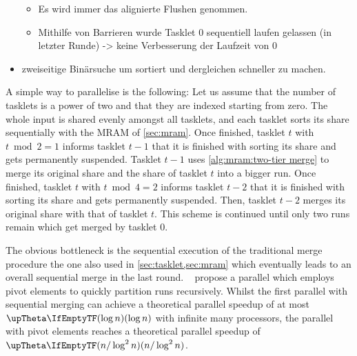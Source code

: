 \begin{itemize}
\begin{itemize}
		\item
		Es wird immer das alignierte Flushen genommen.

		\item
		Mithilfe von Barrieren wurde Tasklet 0 sequentiell laufen gelassen (in letzter Runde) -> keine Verbesserung der Laufzeit von 0
	\end{itemize}

	\item
	zweiseitige Binärsuche um sortiert und dergleichen schneller zu machen.
\end{itemize}

\medbreak

A simple way to parallelise \MS{} is the following:
Let us assume that the number of tasklets is a power of two and that they are indexed starting from zero.
The whole input is shared evenly amongst all tasklets, and each tasklet sorts its share sequentially with the MRAM \MS{} of \cref{sec:mram}.
Once finished, tasklet \(t\) with \(t \bmod 2 = 1\) informs tasklet \(t - 1\) that it is finished with sorting its share and gets permanently suspended.
Tasklet \(t - 1\) uses \cref{alg:mram:two-tier merge} to merge its original share and the share of tasklet \(t\) into a bigger run.
Once finished, tasklet \(t\) with \(t \bmod 4 = 2\) informs tasklet \(t - 2\) that it is finished with sorting its share and gets permanently suspended.
Then, tasklet \(t - 2\) merges its original share with that of tasklet \(t\).
This scheme is continued until only two runs remain which get merged by tasklet \(0\).

The obvious bottleneck is the sequential execution of the traditional merge procedure \Dash the one also used in \cref{sec:tasklet,sec:mram} \Dash which eventually leads to an overall sequential merge in the last round.
~\cite{cormen2013algorithmen} propose a parallel \MS{} which employs pivot elements to quickly partition runs recursively.
Whilst the first parallel \MS{} with sequential merging can achieve a theoretical parallel speedup of at most \(\bigtheta{\log n}\) with infinite many processors, the parallel \MS{} with pivot elements reaches a theoretical parallel speedup of \(\bigtheta{n / \log^2 n}\).

